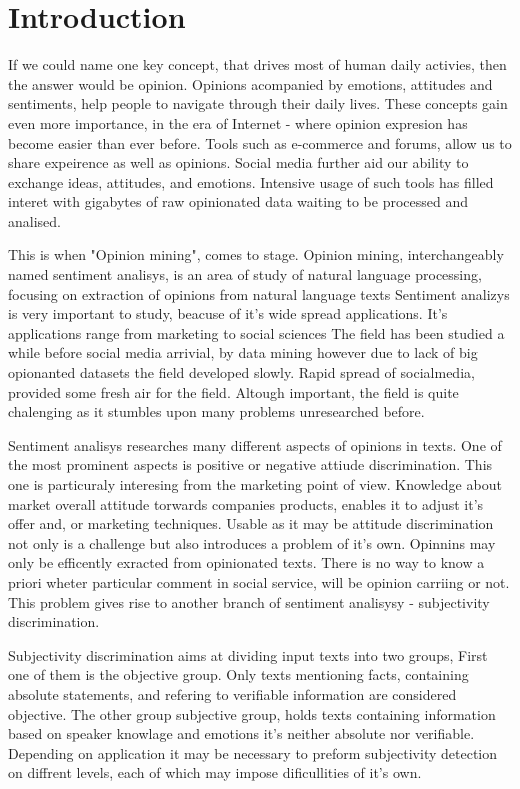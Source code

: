 \chapter{Introduction}

If we could name one key concept, that drives most of human daily activies, then the answer would be opinion. 
Opinions acompanied by emotions, attitudes and sentiments, help people to navigate through their daily lives. 
These concepts gain even more importance, in the era of Internet - where opinion expresion has become easier 
than ever before. Tools such as e-commerce and forums, allow us to share expeirence as well as opinions. 
Social media further aid our ability to exchange ideas, attitudes, and emotions. Intensive usage of such tools 
has filled interet with gigabytes of raw opinionated data waiting to be processed and analised.

This is when "Opinion mining", comes to stage. Opinion mining, interchangeably named sentiment analisys,
 is an area of study of natural language processing, focusing on extraction of opinions from natural language texts
Sentiment analizys is very important to study, beacuse of it's wide spread applications. It's applications range
from marketing to social sciences The field has been studied a while before social media arrivial, by data mining
however due to lack of big opionanted datasets the field developed slowly. Rapid spread of socialmedia, provided some
fresh air for the field. Altough important, the field is quite chalenging as it stumbles upon many problems unresearched before.

Sentiment analisys researches many different aspects of opinions in texts. One of the most prominent aspects is
positive or negative attiude discrimination. This one is particuraly interesing from the marketing point of view. 
Knowledge about market overall attitude torwards companies products, enables it to adjust it's offer and, or marketing techniques.
Usable as it may be attitude discrimination not only is a challenge but also introduces a problem of it's own. 
Opinnins may only be efficently exracted from opinionated texts. There is no way to know a priori wheter particular comment 
in social service, will be opinion carriing or not. This problem gives rise to another branch of 
sentiment analisysy  - subjectivity discrimination.

Subjectivity discrimination aims at dividing input texts into two groups, First one of them is the objective group. 
Only texts mentioning facts, containing absolute statements, and refering to verifiable information are considered objective. 
The other group  subjective group, holds texts containing information based on speaker knowlage and emotions 
it's neither absolute nor verifiable. Depending on application it may be necessary to preform subjectivity detection on diffrent
levels, each of which may impose dificullities of it's own.  

